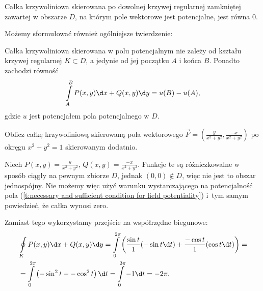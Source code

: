 \begin{corollary}
    Całka krzywoliniowa skierowana po dowolnej krzywej regularnej zamkniętej zawartej w obszarze $D$, na którym pole wektorowe jest potencjalne, jest równa $0$.
\end{corollary}

Możemy sformułować również ogólniejsze twierdzenie:
\begin{theorem}
    \label{t:independence of path in a conservative vector field}
    Całka krzywoliniowa skierowana w polu potencjalnym nie zależy od kształu krzywej regularnej $K \subset D$, a jedynie od jej początku $A$ i końca $B$. Ponadto zachodzi równość
    \[ \int\limits_{A}^B P(x, y) \d x + Q(x, y) \d y = u(B) - u(A), \]
    gdzie $u$ jest potencjałem pola potencjalnego w $D$.
\end{theorem}

\begin{example}
    Oblicz całkę krzywoliniową skierowaną pola wektorowego $\vec{F} = \left(\frac{y}{x^2 + y^2}, \frac{-x}{x^2 + y^2}\right)$ po okręgu $x^2 + y^2 = 1$ skierowanym dodatnio.
\end{example}
\begin{solution}
    Niech $P(x, y) = \frac{y}{x^2 + y^2}$, $Q(x, y) = \frac{-x}{x^2 + y^2}$. Funkcje te są różniczkowalne w sposób ciągły na pewnym zbiorze $D$, jednak $(0, 0) \notin D$, więc nie jest to obszar jednospójny. Nie możemy więc użyć warunku wystarczającego na potencjalność pola (\ref{t:necessary and sufficient condition for field potentiality}) i~tym samym powiedzieć, że całka wynosi zero.

    Zamiast tego wykorzystamy przejście na współrzędne biegunowe:
    \begin{align*}
        &\oint\limits_K P(x, y) \d x + Q(x, y) \d y = \int\limits_0^{2\pi}\left( \frac{\sin t}{1} (-\sin t \d t) + \frac{-\cos t}{1} (\cos t \d t)\right) = \\
        &= \int\limits_0^{2\pi}\left(-\sin^2 t + -\cos^2 t \right) \d t = \int\limits_0^{2\pi} -1 \d t = -2 \pi.
    \end{align*}
\end{solution}

